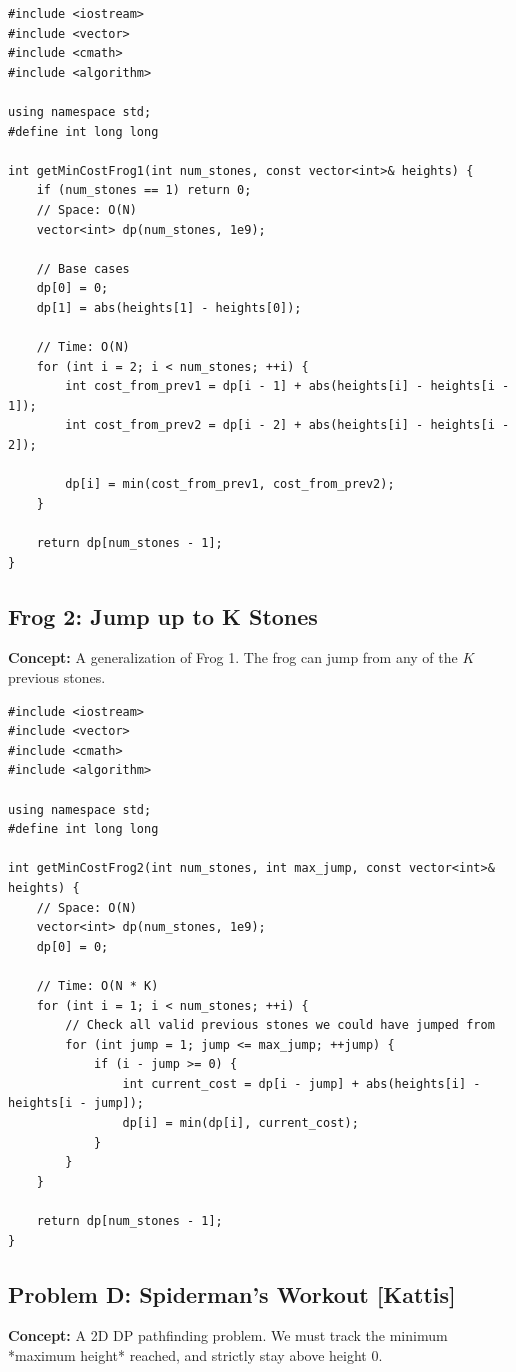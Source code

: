 \begin{lstlisting}
#include <iostream>
#include <vector>
#include <cmath>
#include <algorithm>

using namespace std;
#define int long long

int getMinCostFrog1(int num_stones, const vector<int>& heights) {
    if (num_stones == 1) return 0;
    // Space: O(N)
    vector<int> dp(num_stones, 1e9); 
    
    // Base cases
    dp[0] = 0;
    dp[1] = abs(heights[1] - heights[0]);
    
    // Time: O(N)
    for (int i = 2; i < num_stones; ++i) {
        int cost_from_prev1 = dp[i - 1] + abs(heights[i] - heights[i - 1]);
        int cost_from_prev2 = dp[i - 2] + abs(heights[i] - heights[i - 2]);
        
        dp[i] = min(cost_from_prev1, cost_from_prev2);
    }
    
    return dp[num_stones - 1];
}
\end{lstlisting}

\subsection{Frog 2: Jump up to K Stones}
\textbf{Concept:} A generalization of Frog 1. The frog can jump from any of the $K$ previous stones.

\begin{lstlisting}
#include <iostream>
#include <vector>
#include <cmath>
#include <algorithm>

using namespace std;
#define int long long

int getMinCostFrog2(int num_stones, int max_jump, const vector<int>& heights) {
    // Space: O(N)
    vector<int> dp(num_stones, 1e9);
    dp[0] = 0;
    
    // Time: O(N * K)
    for (int i = 1; i < num_stones; ++i) {
        // Check all valid previous stones we could have jumped from
        for (int jump = 1; jump <= max_jump; ++jump) {
            if (i - jump >= 0) {
                int current_cost = dp[i - jump] + abs(heights[i] - heights[i - jump]);
                dp[i] = min(dp[i], current_cost);
            }
        }
    }
    
    return dp[num_stones - 1];
}
\end{lstlisting}

\subsection{Problem D: Spiderman's Workout [Kattis]}
\textbf{Concept:} A 2D DP pathfinding problem.
We must track the minimum *maximum height* reached, and strictly stay above height 0.

